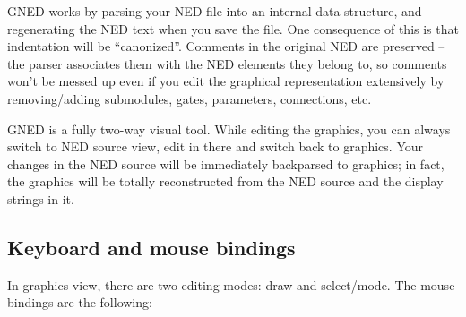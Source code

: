 GNED works by parsing your NED file into an internal data structure,
and regenerating the NED text when you save the file. One consequence
of this is that indentation will be ``canonized''.
Comments in the original NED are preserved -- the parser associates
them with the NED elements they belong to, so comments won't
be messed up even if you edit the graphical representation extensively
by removing/adding submodules, gates, parameters, connections, etc.

GNED is a fully two-way visual tool. While editing the graphics,
you can always switch to NED source view, edit in there and switch
back to graphics. Your changes in the NED source will be immediately
backparsed to graphics; in fact, the graphics will be totally
reconstructed from the NED source and the display strings in
it.


\subsection{Keyboard and mouse bindings}


In graphics view, there are two editing modes: draw and select/mode.
The mouse bindings are the following:


